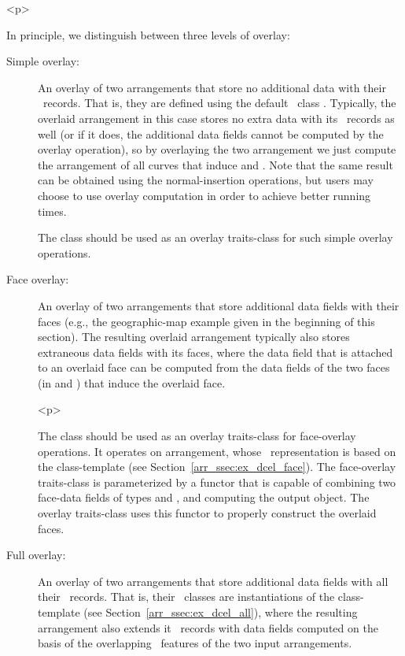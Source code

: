 \begin{ccHtmlOnly}<p>\end{ccHtmlOnly}
In principle, we distinguish between three levels of overlay:
\begin{description}
\item[Simple overlay:]
An overlay of two arrangements that store no additional data
with their \dcel\ records. That is, they are defined using the default 
\dcel\ class . Typically, the overlaid
arrangement in this case stores no extra data with its \dcel\ records as
well (or if it does, the additional data fields cannot be computed by
the overlay operation), so by overlaying the two arrangement we just
compute the arrangement of all curves that induce  and .
Note that the same result can be obtained using the normal-insertion
operations, but users may choose to use overlay computation in order to
achieve better running times.

The  class should be used as an overlay
traits-class for such simple overlay operations.
%
\item[Face overlay:]
An overlay of two arrangements that store additional data
fields with their faces (e.g., the geographic-map example
given in the beginning of this section). The resulting overlaid arrangement
typically also stores extraneous data fields with its faces, where the
data field that is attached to an overlaid face can be computed from the
data fields of the two faces (in  and ) that induce
the overlaid face.

\begin{ccHtmlOnly}<p>\end{ccHtmlOnly}
The  class should be used as an overlay
traits-class for face-overlay operations. It operates on arrangement, whose
\dcel\ representation is based on the 
class-template (see Section~\ref{arr_ssec:ex_dcel_face}). The face-overlay
traits-class is parameterized by a functor that is capable of combining two
face-data fields of types  and
, and computing the output 
object. The overlay traits-class uses this functor to properly construct
the overlaid faces.
%
\item[Full overlay:]
An overlay of two arrangements that store additional data
fields with all their \dcel\ records. That is, their \dcel\ classes
are instantiations of the  class-template (see
Section~\ref{arr_ssec:ex_dcel_all}), where the resulting arrangement
also extends it \dcel\ records with data fields computed on the basis
of the overlapping \dcel\ features of the two input arrangements.
\end{description}

